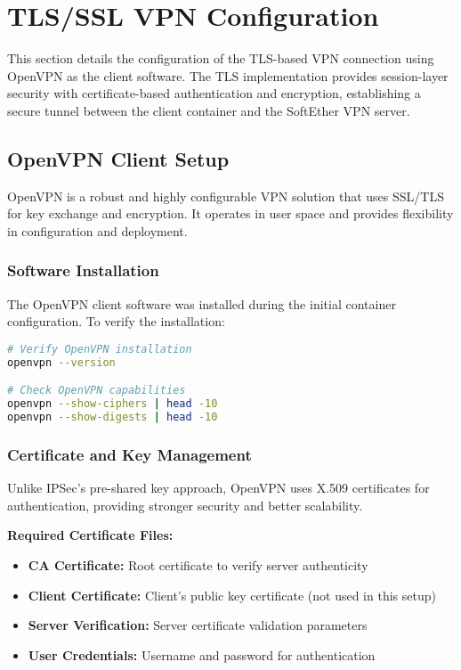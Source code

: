 \newpage

\section{TLS/SSL VPN Configuration}

This section details the configuration of the TLS-based VPN connection using OpenVPN as the client software. The TLS implementation provides session-layer security with certificate-based authentication and encryption, establishing a secure tunnel between the client container and the SoftEther VPN server.

\subsection{OpenVPN Client Setup}

OpenVPN is a robust and highly configurable VPN solution that uses SSL/TLS for key exchange and encryption. It operates in user space and provides flexibility in configuration and deployment.

\subsubsection{Software Installation}

The OpenVPN client software was installed during the initial container configuration. To verify the installation:

\begin{lstlisting}[language=bash]
# Verify OpenVPN installation
openvpn --version

# Check OpenVPN capabilities
openvpn --show-ciphers | head -10
openvpn --show-digests | head -10

\end{lstlisting}

\subsubsection{Certificate and Key Management}

Unlike IPSec's pre-shared key approach, OpenVPN uses X.509 certificates for authentication, providing stronger security and better scalability.

\noindent
\textbf{Required Certificate Files:}

\begin{itemize}
    \item \textbf{CA Certificate:} Root certificate to verify server authenticity
    \item \textbf{Client Certificate:} Client's public key certificate (not used in this setup)
    \item \textbf{Server Verification:} Server certificate validation parameters
    \item \textbf{User Credentials:} Username and password for authentication
\end{itemize}

